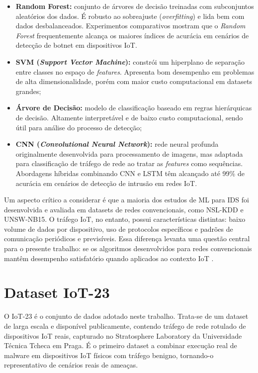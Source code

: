 \begin{itemize}[leftmargin=5em]
    \item \textbf{Random Forest:} conjunto de árvores de decisão treinadas com subconjuntos aleatórios dos dados. É robusto ao sobreajuste (\textit{overfitting}) e lida bem com dados desbalanceados. Experimentos comparativos mostram que o \textit{Random Forest} frequentemente alcança os maiores índices de acurácia em cenários de detecção de botnet em dispositivos IoT.
    \item \textbf{SVM (\textit{Support Vector Machine}):} constrói um hiperplano de separação entre classes no espaço de \textit{features}. Apresenta bom desempenho em problemas de alta dimensionalidade, porém com maior custo computacional em datasets grandes;
    \item \textbf{Árvore de Decisão:} modelo de classificação baseado em regras hierárquicas de decisão. Altamente interpretável e de baixo custo computacional, sendo útil para análise do processo de detecção;
    \item \textbf{CNN (\textit{Convolutional Neural Network}):} rede neural profunda originalmente desenvolvida para processamento de imagens, mas adaptada para classificação de tráfego de rede ao tratar as \textit{features} como sequências. Abordagens híbridas combinando CNN e LSTM têm alcançado até 99\% de acurácia em cenários de detecção de intrusão em redes IoT.
\end{itemize}

Um aspecto crítico a considerar é que a maioria dos estudos de ML para IDS foi desenvolvida e avaliada em datasets de redes convencionais, como NSL-KDD e UNSW-NB15. O tráfego IoT, no entanto, possui características distintas: baixo volume de dados por dispositivo, uso de protocolos específicos e padrões de comunicação periódicos e previsíveis. Essa diferença levanta uma questão central para o presente trabalho: se os algoritmos desenvolvidos para redes convencionais mantêm desempenho satisfatório quando aplicados ao contexto IoT \citep{SouzaArima2024}.

\section{Dataset IoT-23} \label{sec:dataset}

O IoT-23 é o conjunto de dados adotado neste trabalho. Trata-se
de um dataset de larga escala e disponível publicamente, contendo tráfego de
rede rotulado de dispositivos IoT reais, capturado no Stratosphere Laboratory
da Universidade Técnica Tcheca em Praga. É o primeiro dataset a combinar
execução real de malware em dispositivos IoT físicos com tráfego benigno,
tornando-o representativo de cenários reais de ameaças.


